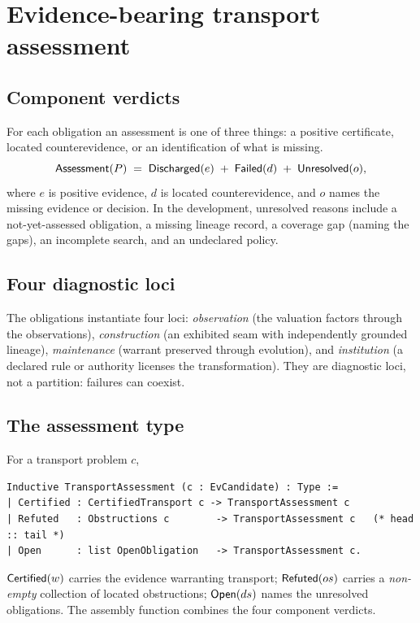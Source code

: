 \section{Evidence-bearing transport assessment}\label{sec:assessment}

\subsection{Component verdicts}
For each obligation an assessment is one of three things: a positive certificate, located counterevidence, or an identification of what is missing.
\[
\mathsf{Assessment}(P) \;=\; \mathsf{Discharged}(e) \;+\; \mathsf{Failed}(d) \;+\; \mathsf{Unresolved}(o),
\]
where $e$ is positive evidence, $d$ is located counterevidence, and $o$ names the missing evidence or decision. In the development, unresolved reasons include a not-yet-assessed obligation, a missing lineage record, a coverage gap (naming the gaps), an incomplete search, and an undeclared policy.

\subsection{Four diagnostic loci}
The obligations instantiate four loci: \emph{observation} (the valuation factors through the observations), \emph{construction} (an exhibited seam with independently grounded lineage), \emph{maintenance} (warrant preserved through evolution), and \emph{institution} (a declared rule or authority licenses the transformation). They are diagnostic loci, not a partition: failures can coexist.

\subsection{The assessment type}
For a transport problem $c$,
\begin{lstlisting}
Inductive TransportAssessment (c : EvCandidate) : Type :=
| Certified : CertifiedTransport c -> TransportAssessment c
| Refuted   : Obstructions c        -> TransportAssessment c   (* head :: tail *)
| Open      : list OpenObligation   -> TransportAssessment c.
\end{lstlisting}
$\mathsf{Certified}(w)$ carries the evidence warranting transport; $\mathsf{Refuted}(os)$ carries a \emph{non-empty} collection of located obstructions; $\mathsf{Open}(ds)$ names the unresolved obligations. The assembly function combines the four component verdicts.

